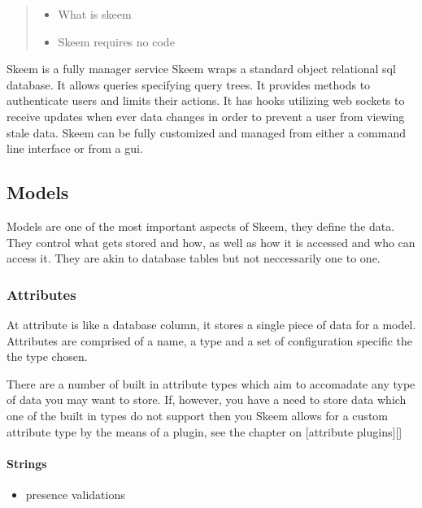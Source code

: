 \documentclass[
  12pt,
]{article}
\providecommand{\tightlist}{%
  \setlength{\itemsep}{0pt}\setlength{\parskip}{0pt}}
\let\oldparagraph\paragraph
\renewcommand{\paragraph}[1]{\oldparagraph{#1}\mbox{}}
\begin{document}
\begin{quote}
\begin{itemize}
\tightlist
\item
  What is skeem
\item
  Skeem requires no code
\end{itemize}
\end{quote}

Skeem is a fully manager service Skeem wraps a standard object
relational sql database. It allows queries specifying query trees. It
provides methods to authenticate users and limits their actions. It has
hooks utilizing web sockets to receive updates when ever data changes in
order to prevent a user from viewing stale data. Skeem can be fully
customized and managed from either a command line interface or from a
gui.

\hypertarget{models}{%
\subsection{Models}\label{models}}

Models are one of the most important aspects of Skeem, they define the
data. They control what gets stored and how, as well as how it is
accessed and who can access it. They are akin to database tables but not
neccessarily one to one.

\hypertarget{attributes}{%
\subsubsection{Attributes}\label{attributes}}

At attribute is like a database column, it stores a single piece of data
for a model. Attributes are comprised of a name, a type and a set of
configuration specific the the type chosen.

There are a number of built in attribute types which aim to accomadate
any type of data you may want to store. If, however, you have a need to
store data which one of the built in types do not support then you Skeem
allows for a custom attribute type by the means of a plugin, see the
chapter on {[}attribute plugins{]}{[}{]}

\hypertarget{strings}{%
\paragraph{Strings}\label{strings}}

\begin{itemize}
\tightlist
\item
  presence validations
\end{itemize}
\end{document}
